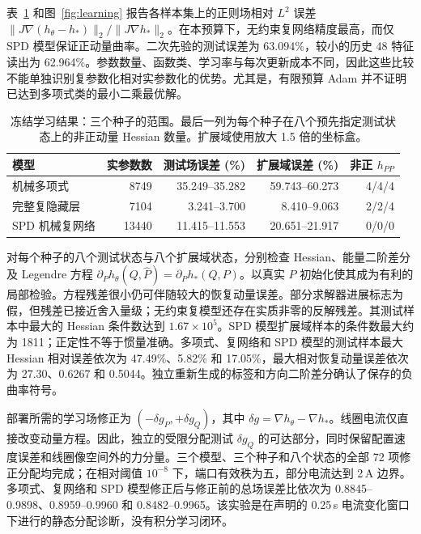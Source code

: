 表~\ref{tab:learn-errors} 和图~\ref{fig:learning} 报告各样本集上的正则场相对 $L^2$ 误差 $\|J\nabla(h_\theta-h_*)\|_2/\|J\nabla h_*\|_2$。在本预算下，无约束复网络精度最高，而仅 SPD 模型保证正动量曲率。二次先验的测试误差为 63.094\%，较小的历史 48 特征读出为 62.964\%。参数数量、函数类、学习率与每次更新成本不同，因此这些比较不能单独识别复参数化相对实参数化的优势。尤其是，有限预算 Adam 并不证明已达到多项式类的最小二乘最优解。

\begin{table}[t]
 \centering
 \caption{冻结学习结果：三个种子的范围。最后一列为每个种子在八个预先指定测试状态上的非正动量 Hessian 数量。扩展域使用放大 1.5 倍的坐标盒。}
 \label{tab:learn-errors}
 \small\setlength{\tabcolsep}{3.5pt}
 \begin{tabular}{lrrrr}
 \toprule
 模型 & 实参数数 & 测试场误差 (\%) & 扩展域误差 (\%) & 非正 $h_{PP}$ \\
 \midrule
 机械多项式 & 8749 & 35.249--35.282 & 59.743--60.273 & 4/4/4 \\
 完整复隐藏层 & 7104 & 3.241--3.700 & 8.410--9.063 & 2/2/4 \\
 SPD 机械复网络 & 13440 & 11.415--11.553 & 20.651--21.917 & 0/0/0 \\
 \bottomrule
 \end{tabular}
\end{table}

对每个种子的八个测试状态与八个扩展域状态，分别检查 Hessian、能量二阶差分及 Legendre 方程 $\partial_Ph_\theta(Q,\widehat P)=\partial_Ph_*(Q,P)$。以真实 $P$ 初始化使其成为有利的局部检验。方程残差很小仍可伴随较大的恢复动量误差。部分求解器进展标志为假，但残差已接近舍入量级；无约束复模型还存在实质非零的反解残差。其测试样本中最大的 Hessian 条件数达到 $1.67\times10^5$。SPD 模型扩展域样本的条件数最大约为 1811；正定性不等于惯量准确。多项式、复网络和 SPD 模型的测试样本最大 Hessian 相对误差依次为 47.49\%、5.82\% 和 17.05\%，最大相对恢复动量误差依次为 27.30、0.6267 和 0.5044。独立重新生成的标签和方向二阶差分确认了保存的负曲率符号。

部署所需的学习场修正为 $(-\delta g_P,+\delta g_Q)$，其中 $\delta g=\nabla h_\theta-\nabla h_*$。线圈电流仅直接改变动量方程。因此，独立的受限分配测试 $\delta g_Q$ 的可达部分，同时保留配置速度误差和线圈像空间外的力分量。三个模型、三个种子和八个状态的全部 72 项修正分配均完成；在相对阈值 $10^{-8}$ 下，端口有效秩为五，部分电流达到 2\,A 边界。多项式、复网络和 SPD 模型修正后与修正前的总场误差比依次为 0.8845--0.9898、0.8959--0.9960 和 0.8482--0.9965。该实验是在声明的 0.25\,s 电流变化窗口下进行的静态分配诊断，没有积分学习闭环。


